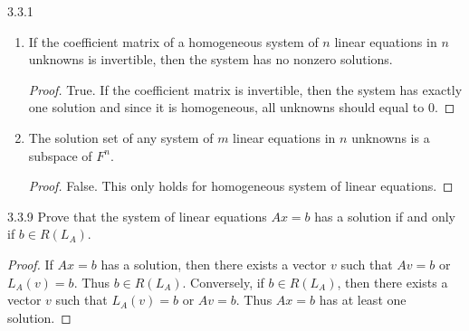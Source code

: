 \documentclass[12pt, a4paper]{article}
\theoremstyle{plain}
\begin{document}
\begin{exercise}{3.3.1}
\begin{enumerate}[label=(\alph*)]
\begin{proof}
	False. A homogeneous system always have a solution, but system of linear equations is not.
	\end{proof}
\item If the coefficient matrix of a homogeneous system of $n$ linear equations in $n$ unknowns is invertible, then the system has no nonzero solutions.
	\begin{proof}
	True. If the coefficient matrix is invertible, then the system has exactly one solution and since it is homogeneous, all unknowns should equal to $0$.
	\end{proof}
\item The solution set of any system of $m$ linear equations in $n$ unknowns is a subspace of $F^n$.
	\begin{proof}
	False. This only holds for homogeneous system of linear equations.
	\end{proof}
\end{enumerate}
\end{exercise}

\begin{exercise}{3.3.9}
Prove that the system of linear equations $Ax=b$ has a solution if and only if $b\in R(L_A)$.
\end{exercise}
	\begin{proof}
	If $Ax=b$ has a solution, then there exists a vector $v$ such that $Av=b$ or $L_A(v)=b$. Thus $b\in R(L_A)$. Conversely, if $b\in R(L_A)$, then there exists a vector $v$ such that $L_A(v)=b$ or $Av=b$. Thus $Ax=b$ has at least one solution.
	\end{proof}

\pagebreak
\end{document}
